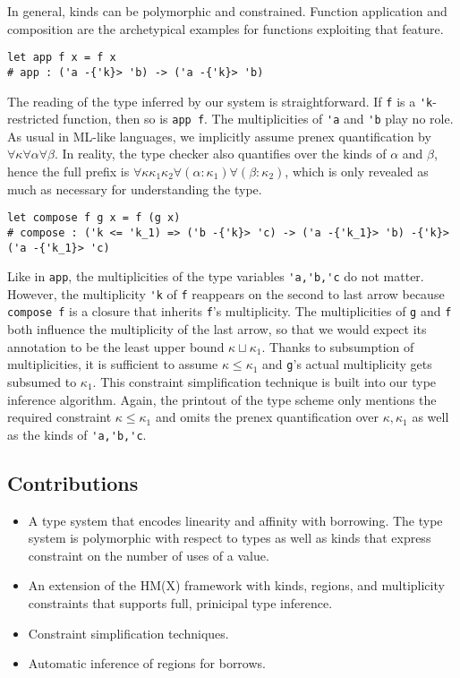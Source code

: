 In general, kinds can be polymorphic and constrained. Function
application and composition are the archetypical
examples for functions exploiting that feature.
\begin{lstlisting}
let app f x = f x
# app : ('a -{'k}> 'b) -> ('a -{'k}> 'b)
\end{lstlisting}
The reading of the type inferred by our system is straightforward. If
\lstinline/f/ is a \lstinline/'k/-restricted function, then so is
\lstinline/app f/. The multiplicities of \lstinline/'a/ and
\lstinline/'b/ play no role. As usual in ML-like languages, we
implicitly assume prenex quantification by
$\forall\kappa\forall\alpha\forall\beta$. In reality, the
type checker also quantifies over the kinds of $\alpha$ and $\beta$,
hence the full prefix is
$\forall\kappa\kappa_1\kappa_2\forall(\alpha:\kappa_1)\forall(\beta:\kappa_2)$,
which is only revealed as much as necessary for understanding the type. 
\begin{lstlisting}
let compose f g x = f (g x) 
# compose : ('k <= 'k_1) => ('b -{'k}> 'c) -> ('a -{'k_1}> 'b) -{'k}> ('a -{'k_1}> 'c)
\end{lstlisting}
Like in \lstinline/app/, the multiplicities of the type variables
\lstinline/'a,'b,'c/ do not matter. However, the multiplicity
\lstinline/'k/ of \lstinline/f/ reappears on the second to last arrow
because \lstinline/compose f/ is a closure that inherits
\lstinline/f/'s multiplicity. The multiplicities of \lstinline/g/  and
\lstinline/f/ both influence the multiplicity of the last arrow, so
that we would expect its annotation to be the least upper bound
$\kappa \sqcup \kappa_1$. Thanks to subsumption of multiplicities, it
is sufficient to assume $\kappa \le \kappa_1$ and \lstinline/g/'s
actual multiplicity gets subsumed to $\kappa_1$. This constraint
simplification technique is built into our type inference algorithm. Again, the printout
of the type scheme only mentions the required constraint
$\kappa\le\kappa_1$ and omits the prenex quantification over $\kappa,
\kappa_1$ as well as the kinds of \lstinline/'a,'b,'c/.

\subsection{Contributions}
\label{sec:contributions}

\begin{itemize}
\item A type system that encodes linearity and affinity with
  borrowing. The type system is polymorphic with respect to types as
  well as kinds that express constraint on the number of uses of a value.
\item An extension of the HM(X) framework
  \cite{DBLP:journals/tapos/OderskySW99} with kinds, regions, and
  multiplicity constraints that supports full, prinicipal type inference.
\item Constraint simplification techniques.
\item Automatic inference of regions for borrows.
\end{itemize}

